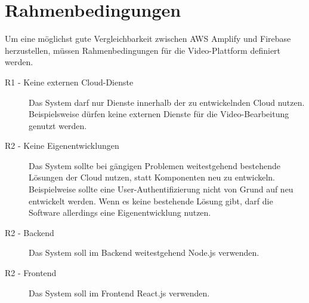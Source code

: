 \section{Rahmenbedingungen}

Um eine möglichst gute Vergleichbarkeit zwischen AWS Amplify und Firebase herzustellen, müssen Rahmenbedingungen für die Video-Plattform definiert werden.

\begin{description}
   \item[R1 - Keine externen Cloud-Dienste] Das System darf nur Dienste innerhalb der zu entwickelnden Cloud nutzen. Beispielsweise dürfen keine externen Dienste für die Video-Bearbeitung genutzt werden.
   \item[R2 - Keine Eigenentwicklungen] Das System sollte bei gängigen Problemen weitestgehend bestehende Lösungen der Cloud nutzen, statt Komponenten neu zu entwickeln. Beispielweise sollte eine User-Authentifizierung nicht von Grund auf neu entwickelt werden. Wenn es keine bestehende Lösung gibt, darf die Software allerdings eine Eigenentwicklung nutzen.
   \item[R2 - Backend] Das System soll im Backend weitestgehend Node.js verwenden.
   \item[R2 - Frontend] Das System soll im Frontend React.js verwenden.
\end{description}